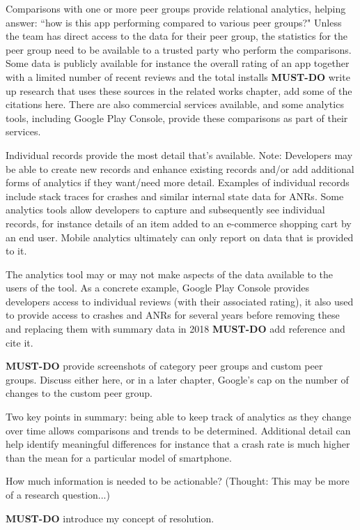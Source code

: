Comparisons with one or more peer groups provide relational analytics, helping answer: ``how is this app performing compared to various peer groups?" Unless the team has direct access to the data for their peer group, the statistics for the peer group need to be available to a trusted party who perform the comparisons. Some data is publicly available for instance the overall rating of an app together with a limited number of recent reviews and the total installs \textbf{MUST-DO} write up research that uses these sources in the related works chapter, add some of the citations here. There are also commercial services available, and some analytics tools, including Google Play Console, provide these comparisons as part of their services.

Individual records provide the most detail that's available. Note: Developers may be able to create new records and enhance existing records and/or add additional forms of analytics if they want/need more detail. Examples of individual records include stack traces for crashes and similar internal state data for ANRs. Some analytics tools allow developers to capture and subsequently see individual records, for instance details of an item added to an e-commerce shopping cart by an end user. Mobile analytics ultimately can only report on data that is provided to it. 

The analytics tool may or may not make aspects of the data available to the users of the tool. As a concrete example, Google Play Console provides developers access to individual reviews (with their associated rating), it also used to provide access to crashes and ANRs for several years before removing these and replacing them with summary data in 2018 \textbf{MUST-DO} add reference and cite it.

\textbf{MUST-DO} provide screenshots of category peer groups and custom peer groups. Discuss either here, or in a later chapter, Google's cap on the number of changes to the custom peer group.

Two key points in summary: being able to keep track of analytics as they change over time allows comparisons and trends to be determined. Additional detail can help identify meaningful differences for instance that a crash rate is much higher than the mean for a particular model of smartphone. 

How much information is needed to be actionable? (Thought: This may be more of a research question...)


\textbf{MUST-DO} introduce my concept of resolution.

